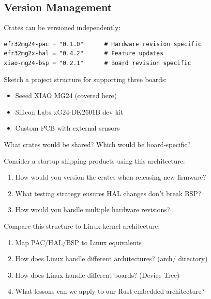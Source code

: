 \subsection{Version Management}
Crates can be versioned independently:
\begin{verbatim}
efr32mg24-pac = "0.1.0"      # Hardware revision specific
efr32mg2x-hal = "0.4.2"      # Feature updates
xiao-mg24-bsp = "0.2.1"      # Board revision specific
\end{verbatim}

\begin{exercise}[Easy]
    Sketch a project structure for supporting three boards:
    \begin{itemize}
        \item Seeed XIAO MG24 (covered here)
        \item Silicon Labs xG24-DK2601B dev kit
        \item Custom PCB with external sensors
    \end{itemize}
    What crates would be shared? Which would be board-specific?
\end{exercise}

\begin{exercise}[Medium]
    Consider a startup shipping products using this architecture:
    \begin{enumerate}
        \item How would you version the crates when releasing new firmware?
        \item What testing strategy ensures HAL changes don't break BSP?
        \item How would you handle multiple hardware revisions?
    \end{enumerate}
\end{exercise}

\begin{exercise}[Hard]
    Compare this structure to Linux kernel architecture:
    \begin{enumerate}
        \item Map PAC/HAL/BSP to Linux equivalents
        \item How does Linux handle different architectures? (arch/ directory)
        \item How does Linux handle different boards? (Device Tree)
        \item What lessons can we apply to our Rust embedded architecture?
    \end{enumerate}
\end{exercise}
\clearpage
